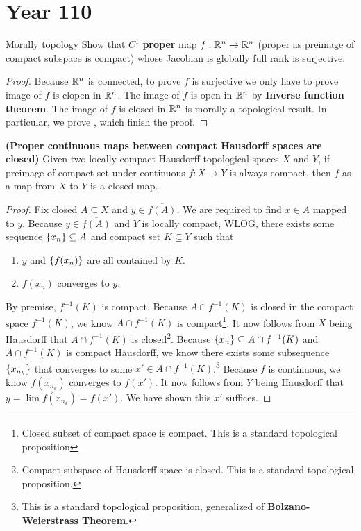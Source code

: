 \documentclass{report}
\begin{document}
\section{Year 110}
\begin{question}{Morally topology}{}
  Show that $C^1$ \textbf{proper} map  $f:\mathbb{R}^n\rightarrow \mathbb{R}^n$ (proper as preimage of compact subspace is compact) whose Jacobian is globally full rank is surjective. 
\end{question}
\begin{proof}
  Because $\mathbb{R}^n$ is connected,  to prove $f$ is surjective we only have to prove image of $f$ is clopen in  $\mathbb{R}^n$.  The image of $f$ is open in $\mathbb{R}^n$ by  \textbf{Inverse function theorem}. The image of $f$ is closed in  $\mathbb{R}^n$ is morally a topological result. In particular, we prove , which finish the proof.
\end{proof}
\begin{theorem}
\label{Pcmf}
\textbf{(Proper continuous maps between compact Hausdorff spaces are closed)} Given two locally compact Hausdorff topological spaces $X$ and $Y$, if preimage of compact set under continuous $f:X\rightarrow Y$ is always compact, then  $f$ as a map from  $X$ to  $Y$ is a closed map.  
\end{theorem}
\begin{proof}
Fix closed $A\subseteq X$ and $y \in \overline{f(A)}$. We are required to find $x \in A$ mapped to $y$. Because $y \in \overline{f(A)}$ and $Y$ is locally compact, WLOG, there exists some sequence $\left\{ x_n \right\}\subseteq A$ and compact set $K\subseteq Y$  such that 
\begin{enumerate}[label=(\roman*)]
  \item $y$ and $\left\{ f(x_n) \right\}$ are all contained by $K$. 
  \item $f(x_n)$ converges to $y$. 
\end{enumerate}
By premise, $f^{-1}(K)$ is compact. Because $A\cap f^{-1}(K)$ is closed in the  compact space $f^{-1}(K)$, we know $A\cap f^{-1}(K)$ is compact\footnote{Closed subset of compact space is compact. This is a standard topological proposition}. It now follows from $X$ being Hausdorff that  $A \cap f^{-1}(K)$ is closed\footnote{Compact subspace of Hausdorff space is closed. This is a standard topological proposition.}. Because $\left\{ x_n \right\}\subseteq A \cap f^{-1}(K)$ and $A\cap f^{-1}(K)$ is compact Hausdorff, we know there exists some  subsequence $\left\{ x_{n_k} \right\}$ that converges to some $x'\in A \cap f^{-1}(K)$.\footnote{This is a standard topological proposition, generalized of \textbf{Bolzano-Weierstrass Theorem}.} Because $f$ is continuous, we know  $f(x_{n_k})$ converges to $f(x')$. It now follows from $Y$ being Hausdorff that  $y=\lim f(x_{n_k})=f(x')$. We have shown this $x'$ suffices. 
\end{proof}
\end{document}
